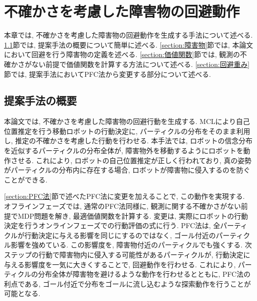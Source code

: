 \chapter{不確かさを考慮した障害物の回避動作} \label{chapter:method}
本章では, 不確かさを考慮した障害物の回避動作を生成する手法について述べる. 
\ref{section:method overview}節では, 提案手法の概要について簡単に述べる. 
\ref{section:障害物}節では, 本論文において回避を行う障害物の定義を述べる. 
\ref{section:価値関数}節では, 観測の不確かさがない前提で価値関数を計算する方法について述べる. 
\ref{section:回避重み}節では, 提案手法においてPFC法から変更する部分について述べる. 


\section{提案手法の概要} \label{section:method overview}
本論文では, 不確かさを考慮した障害物の回避行動を生成する. 
MCLにより自己位置推定を行う移動ロボットの行動決定に, パーティクルの分布をそのまま利用し, 推定の不確かさを考慮した行動を行わせる. 
本手法では, ロボットの信念分布を近似するパーティクルの分布全体が, 障害物外を移動するようにロボットを動作させる. 
これにより, ロボットの自己位置推定が正しく行われており, 真の姿勢がパーティクルの分布内に存在する場合, 
ロボットが障害物に侵入するのを防ぐことができる. 



\ref{section:PFC法}節で述べたPFC法に変更を加えることで, この動作を実現する. 
オフラインフェーズでは, 通常のPFC法同様に, 観測に関する不確かさがない前提でMDP問題を解き, 最適価値関数を計算する. 
変更は, 実際にロボットの行動決定を行うオンラインフェーズでの行動評価の式に行う. 
PFC法は, 全パーティクルが行動決定に与える影響を同じにするのではなく, ゴール付近のパーティクル影響を強めている. 
この影響度を, 障害物付近のパーティクルでも強くする. 
次ステップの行動で障害物内に侵入する可能性があるパーティクルが, 行動決定に与える影響度を一気に大きくすることで, 回避動作を行わせる. 
これにより, パーティクルの分布全体が障害物を避けるような動作を行わせるとともに, PFC法の利点である, ゴール付近で分布をゴールに流し込むような探索動作を行うことが可能となる. 



